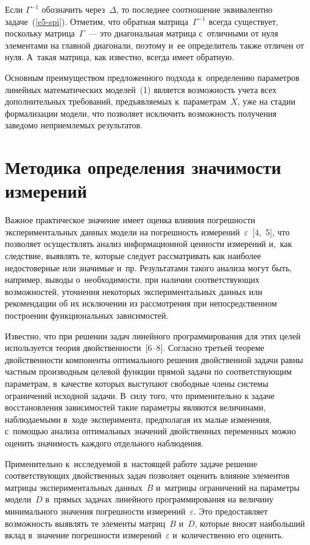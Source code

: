\begin{multicols}{2}
  Если $\Gamma^{-1}$ обозначить через~$\Delta$, то последнее соотношение
эквивалентно задаче~(\ref{e5-spi}). Отметим, что обратная
матрица~$\Gamma^{-1}$ всегда существует, поскольку матрица~$\Gamma$~---
это диагональная матрица с~отличными от нуля элементами на главной
диагонали, поэтому и~ее определитель также отличен от нуля. А~такая матрица,
как известно, всегда имеет обратную.

  Основным преимуществом предложенного подхода к~определению
параметров линейных математических моделей~(1) является возможность
учета всех дополнительных требований, предъявляемых к~параметрам~$X$,
уже на стадии формализации модели, что позволяет исключить возможность
получения заведомо неприемлемых результатов.

  \section{Методика определения значимости измерений}

  Важное практическое значение имеет оценка влияния погрешности
экспериментальных данных модели на погрешность
измерений~$\varepsilon$~[4,~5], что позволяет осуществлять анализ
информационной ценности измерений и,~как следствие, выявлять те, которые
следует рассматривать как наиболее недостоверные или значимые и~пр.
Результатами такого анализа могут быть, например, выводы о~необходимости,
при наличии соответствующих возможностей, уточнения некоторых
экспериментальных данных или рекомендации об их исключении из
рассмотрения при непосредственном построении функциональных
зависимостей.

  Известно, что при решении задач линейного программирования для этих
целей используется теория двойственности~[6--8]. Согласно третьей теореме
двойственности компоненты оптимального решения двойственной задачи
равны частным производным целевой функции прямой задачи по
соответствующим параметрам, в~качестве которых выступают свободные
члены системы ограничений исходной задачи. В~силу того, что применительно
к задаче восстановления зависимостей такие па\-ра\-мет\-ры являются величинами,
наблюдаемыми в~ходе эксперимента, предполагая их малые изменения,
с~помощью анализа оптимальных значений двойственных переменных можно
оценить значимость каждого отдельного наблюдения.

  Применительно к~исследуемой в~настоящей работе задаче решение
соответствующих двойственных задач позволяет оценить влияние элементов
матрицы экспериментальных данных~$B$ и~матрицы ограничений на
параметры модели~$D$ в~прямых задачах линейного программирования на
величину минимального значения погрешности измерений~$\varepsilon$. Это
предоставляет возможность выявлять те элементы матриц~$B$ и~$D$, которые
вносят наибольший вклад в~значение погрешности измерений~$\varepsilon$
и~количественно его оценить.


\end{multicols}
